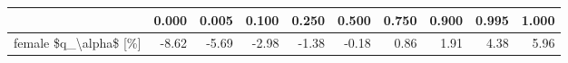 \begin{tabular}{lrrrrrrrrr}
\toprule
{} &  0.000 &  0.005 &  0.100 &  0.250 &  0.500 &  0.750 &  0.900 &  0.995 &  1.000 \\
\midrule
female \$q\_\textbackslash alpha\$ [\%] &  -8.62 &  -5.69 &  -2.98 &  -1.38 &  -0.18 &   0.86 &   1.91 &   4.38 &   5.96 \\
\bottomrule
\end{tabular}
